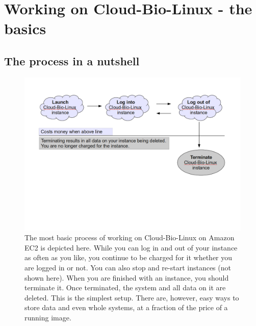 \section{Working on Cloud-Bio-Linux - the basics}

\subsection{The process in a nutshell}

\begin{figure}[!hd]
\includegraphics[width=\maxwidth]{"images/nutshell"}
\caption[Start an Instance]{\label{fig:nutshell}The most basic process of working on Cloud-Bio-Linux on Amazon EC2 is depicted here. While you can log in and out of your instance as often as you like, you continue to be charged for it whether you are logged in or not. You can also stop and re-start instances (not shown here). When you are finished with an instance, you should terminate it. Once terminated, the system and all data on it are deleted. This is the simplest setup. There are, however, easy ways to store data and even whole systems, at a fraction of the price of a running image.}
\end{figure}

